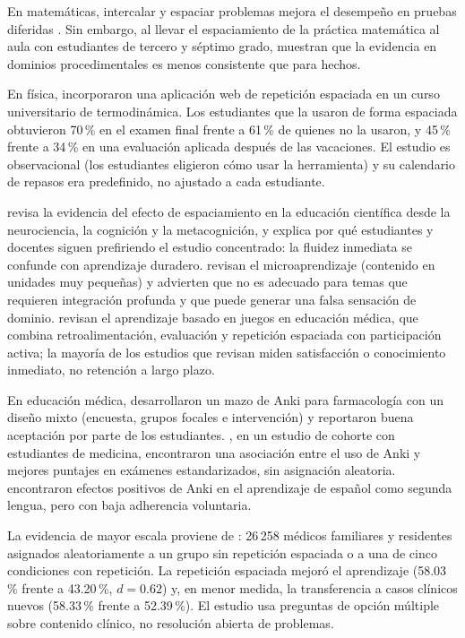 \documentclass[12pt]{article}
\theoremstyle{definition}
\begin{document}
En matemáticas, intercalar y espaciar problemas mejora el desempeño en pruebas diferidas \citep{rohrer2007,rohrer2015}. Sin embargo, al llevar el espaciamiento de la práctica matemática al aula con estudiantes de tercero y séptimo grado, \citet{barzagar2019} muestran que la evidencia en dominios procedimentales es menos consistente que para hechos.

En física, \citet{voice2020} incorporaron una aplicación web de repetición espaciada en un curso universitario de termodinámica. Los estudiantes que la usaron de forma espaciada obtuvieron 70\,\% en el examen final frente a 61\,\% de quienes no la usaron, y 45\,\% frente a 34\,\% en una evaluación aplicada después de las vacaciones. El estudio es observacional (los estudiantes eligieron cómo usar la herramienta) y su calendario de repasos era predefinido, no ajustado a cada estudiante.

\citet{yuan2022} revisa la evidencia del efecto de espaciamiento en la educación científica desde la neurociencia, la cognición y la metacognición, y explica por qué estudiantes y docentes siguen prefiriendo el estudio concentrado: la fluidez inmediata se confunde con aprendizaje duradero. \citet{mostrady2025} revisan el microaprendizaje (contenido en unidades muy pequeñas) y advierten que no es adecuado para temas que requieren integración profunda y que puede generar una falsa sensación de dominio. \citet{xu2023} revisan el aprendizaje basado en juegos en educación médica, que combina retroalimentación, evaluación y repetición espaciada con participación activa; la mayoría de los estudios que revisan miden satisfacción o conocimiento inmediato, no retención a largo plazo.

En educación médica, \citet{jape2022} desarrollaron un mazo de Anki para farmacología con un diseño mixto (encuesta, grupos focales e intervención) y reportaron buena aceptación por parte de los estudiantes. \citet{gilbert2023}, en un estudio de cohorte con estudiantes de medicina, encontraron una asociación entre el uso de Anki y mejores puntajes en exámenes estandarizados, sin asignación aleatoria. \citet{hanson2020} encontraron efectos positivos de Anki en el aprendizaje de español como segunda lengua, pero con baja adherencia voluntaria.

La evidencia de mayor escala proviene de \citet{price2025}: 26\,258 médicos familiares y residentes asignados aleatoriamente a un grupo sin repetición espaciada o a una de cinco condiciones con repetición. La repetición espaciada mejoró el aprendizaje (58.03\,\% frente a 43.20\,\%, $d=0.62$) y, en menor medida, la transferencia a casos clínicos nuevos (58.33\,\% frente a 52.39\,\%). El estudio usa preguntas de opción múltiple sobre contenido clínico, no resolución abierta de problemas.
\end{document}
